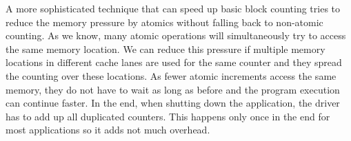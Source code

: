 A more sophisticated technique that can speed up basic block counting tries to reduce the memory pressure by atomics without falling back to non-atomic counting.
As we know, many atomic operations will simultaneously try to access the same memory location.
We can reduce this pressure if multiple memory locations in different cache lanes are used for the same counter and they spread the counting over these locations.
As fewer atomic increments access the same memory, they do not have to wait as long as before and the program execution can continue faster.
In the end, when shutting down the application, the driver has to add up all duplicated counters.
This happens only once in the end for most applications so it adds not much overhead.
